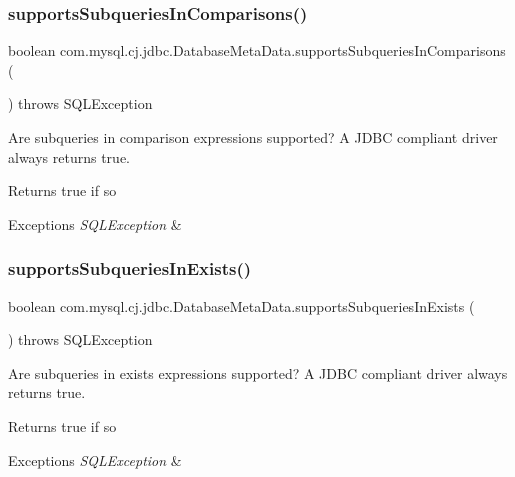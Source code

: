 \subsubsection{\texorpdfstring{supports\+Subqueries\+In\+Comparisons()}{supportsSubqueriesInComparisons()}}
{\footnotesize\ttfamily boolean com.\+mysql.\+cj.\+jdbc.\+Database\+Meta\+Data.\+supports\+Subqueries\+In\+Comparisons (\begin{DoxyParamCaption}{ }\end{DoxyParamCaption}) throws S\+Q\+L\+Exception}

Are subqueries in comparison expressions supported? A J\+D\+BC compliant driver always returns true.

\begin{DoxyReturn}{Returns}
true if so 
\end{DoxyReturn}

\begin{DoxyExceptions}{Exceptions}
{\em S\+Q\+L\+Exception} & \\
\hline
\end{DoxyExceptions}
\mbox{\label{classcom_1_1mysql_1_1cj_1_1jdbc_1_1_database_meta_data_aa6d5bdc1a6a78b6493817ca74db15cdd}} 
\subsubsection{\texorpdfstring{supports\+Subqueries\+In\+Exists()}{supportsSubqueriesInExists()}}
{\footnotesize\ttfamily boolean com.\+mysql.\+cj.\+jdbc.\+Database\+Meta\+Data.\+supports\+Subqueries\+In\+Exists (\begin{DoxyParamCaption}{ }\end{DoxyParamCaption}) throws S\+Q\+L\+Exception}

Are subqueries in exists expressions supported? A J\+D\+BC compliant driver always returns true.

\begin{DoxyReturn}{Returns}
true if so 
\end{DoxyReturn}

\begin{DoxyExceptions}{Exceptions}
{\em S\+Q\+L\+Exception} & \\
\hline
\end{DoxyExceptions}
\mbox{\label{classcom_1_1mysql_1_1cj_1_1jdbc_1_1_database_meta_data_a27640ea9fba92317515c539f362a1bde}} 
